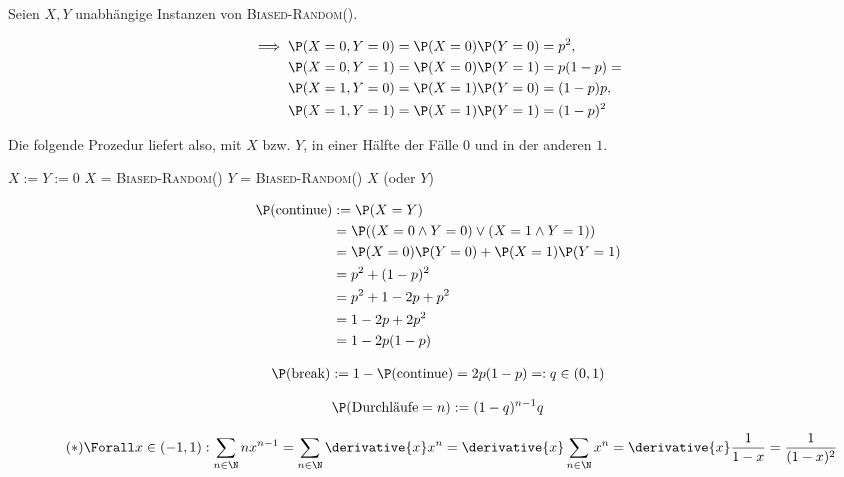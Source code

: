 \begin{solution}

Seien $X, Y$ unabhängige Instanzen von \textsc{Biased-Random}().

\begin{align*}
    \implies
    \P(X = 0, Y = 0) & = \P(X = 0) \P(Y = 0) = p^2, \\
    \P(X = 0, Y = 1) & = \P(X = 0) \P(Y = 1) = p (1 - p) = \\
    \P(X = 1, Y = 0) & = \P(X = 1) \P(Y = 0) = (1 - p) p, \\
    \P(X = 1, Y = 1) & = \P(X = 1) \P(Y = 1) = (1 - p)^2
\end{align*}

Die folgende Prozedur liefert also, mit $X$ bzw. $Y$, in einer Hälfte der Fälle $0$ und in der anderen $1$.

\phantom{}

\begin{algorithmic}
    \State $X := Y := 0$
        \State $X$ = \textsc{Biased-Random}()
        \State $Y$ = \textsc{Biased-Random}()
    \EndWhile
    \State \Return $X$ (oder $Y$)
    \EndProcedure
\end{algorithmic}

\phantom{}

\begin{align*}
    \P(\text{continue})
    & :=
    \P(X = Y) \\
    & =
    \P((X = 0 \land Y = 0) \lor (X = 1 \land Y = 1)) \\
    & =
    \P(X = 0) \P(Y = 0) + \P(X = 1) \P(Y = 1) \\
    & =
    p^2 + (1 - p)^2 \\
    & =
    p^2 + 1 - 2 p + p^2 \\
    & =
    1 - 2 p + 2 p^2 \\
    & =
    1 - 2 p (1 - p)
\end{align*}

\begin{align*}
    \P(\text{break})
    :=
    1 - \P(\text{continue})
    =
    2 p (1 - p)
    =:
    q \in (0, 1)
\end{align*}

\begin{align*}
    \P(\text{Durchläufe} = n)
    :=
    (1 - q)^{n-1} q
\end{align*}

\begin{align} \tag{$\ast$}
    \Forall x \in (-1, 1):
    \sum_{n \in \N}
    n x^{n-1}
    =
    \sum_{n \in \N}
        \derivative{x}
            x^n
    =
    \derivative{x}
        \sum_{n \in \N}
            x^n
    =
    \derivative{x}
        \frac{1}{1 - x}
    =
    \frac{1}{(1 - x)^2}
\end{align}


\end{solution}
